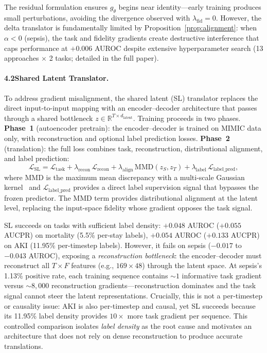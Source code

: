 The residual formulation ensures $g_\theta$ begins near identity---early training produces small perturbations, avoiding the divergence observed with $\lambda_{\mathrm{fid}} = 0$.
However, the delta translator is fundamentally limited by Proposition~\ref{prop:alignment}: when $\alpha < 0$ (sepsis), the task and fidelity gradients create destructive interference that caps performance at $+0.006$ AUROC despite extensive hyperparameter search (13 approaches $\times$ 2 tasks; detailed in the full paper).

\paragraph{4.2\quad Shared Latent Translator.}
\label{sec:sl}
To address gradient misalignment, the shared latent (SL) translator replaces the direct input-to-input mapping with an encoder--decoder architecture that passes through a shared bottleneck $z \in \mathbb{R}^{T \times d_{\mathrm{latent}}}$.
Training proceeds in two phases.
\textbf{Phase~1} (autoencoder pretrain): the encoder--decoder is trained on MIMIC data only, with reconstruction and optional label prediction losses.
\textbf{Phase~2} (translation): the full loss combines task, reconstruction, distributional alignment, and label prediction:
\begin{equation}
\label{eq:sl_loss}
\mathcal{L}_{\mathrm{SL}} = \mathcal{L}_{\mathrm{task}} + \lambda_{\mathrm{recon}}\,\mathcal{L}_{\mathrm{recon}} + \lambda_{\mathrm{align}}\,\mathrm{MMD}(z_S, z_T) + \lambda_{\mathrm{label}}\,\mathcal{L}_{\mathrm{label\_pred}},
\end{equation}
where $\mathrm{MMD}$ is the maximum mean discrepancy with a multi-scale Gaussian kernel~\cite{gretton2012kernel} and $\mathcal{L}_{\mathrm{label\_pred}}$ provides a direct label supervision signal that bypasses the frozen predictor.
The MMD term provides distributional alignment at the latent level, replacing the input-space fidelity whose gradient opposes the task signal.

SL succeeds on tasks with sufficient label density: $+0.048$ AUROC ($+0.055$ AUCPR) on mortality (5.5\% per-stay labels), $+0.054$ AUROC ($+0.133$ AUCPR) on AKI (11.95\% per-timestep labels).
However, it fails on sepsis ($-0.017$ to $-0.043$ AUROC), exposing a \emph{reconstruction bottleneck}: the encoder--decoder must reconstruct all $T \times F$ features (e.g., $169 \times 48$) through the latent space.
At sepsis's 1.13\% positive rate, each training sequence contains ${\sim}1$ informative task gradient versus ${\sim}8{,}000$ reconstruction gradients---reconstruction dominates and the task signal cannot steer the latent representations.
Crucially, this is not a per-timestep or causality issue: AKI is also per-timestep and causal, yet SL succeeds because its 11.95\% label density provides $10\times$ more task gradient per sequence.
This controlled comparison isolates \emph{label density} as the root cause and motivates an architecture that does not rely on dense reconstruction to produce accurate translations.


